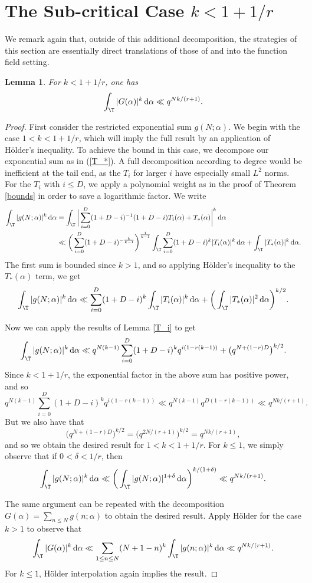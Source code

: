 \documentclass[reqno,11pt]{amsart}
\newtheorem{lemma}[theorem]{Lemma}
\theoremstyle{definition}
\theoremstyle{remark}
\numberwithin{equation}{section}
\renewcommand{\d}{\,{\rm d}} %
\newcommand{\<}{\begin{equation}}
\renewcommand{\>}{\end{equation}}
\begin{document}
\section{The Sub-critical Case $k<1+1/r$}

 We remark again that, outside of this additional decomposition, the strategies of this section are essentially direct translations of those of \cite{balog-ruzsa:2001} and \cite{keil:2013} into the function field setting.
\begin{lemma}\label{sub-upper}
    For $k < 1+1/r$, one has
    \[\int_\T |G(\alpha)|^k \d\alpha \ll q^{Nk/(r+1)}.\]
\end{lemma}
\begin{proof}
    First consider the restricted exponential sum $g(N;\alpha)$. We begin with the case $1 < k < 1+1/r$, which will imply the full result by an application of H\"older's inequality. To achieve the bound in this case, we decompose our exponential sum as in (\ref{T_*}). A full decomposition according to degree would be inefficient at the tail end, as the $T_i$ for larger $i$ have especially small $L^2$ norms. For the $T_i$ with $i\leq D$, we apply a polynomial weight as in the proof of Theorem \ref{bounds} in order to save a logarithmic factor. We write
    \begin{align*}
        \int_\T |g(N;\alpha)|^k \d\alpha &= \int_\T \bigg|\sum_{i=0}^{D} (1+D-i)^{-1}(1+D-i)T_i(\alpha)+ T_*(\alpha)\bigg|^k \d\alpha \\
        &\ll \bigg(\sum_{i=0}^D (1+D-i)^{-\frac{k}{k-1}}\bigg)^{\frac{1}{k-1}}\int_\T\sum_{i=0}^{D} (1+D-i)^k|T_i(\alpha)|^k\d\alpha + \int_\T | T_*(\alpha)|^k \d\alpha.
    \end{align*}
    The first sum is bounded since $k>1$, and so applying H\"older's inequality to the $T_*(\alpha)$ term, we get
    \[\int_\T |g(N;\alpha)|^k \d\alpha \ll \sum_{i=0}^{D} (1+D-i)^k\int_\T|T_i(\alpha)|^k\d\alpha + \bigg(\int_\T | T_*(\alpha)|^2 \d\alpha\bigg)^{k/2}.\]
    
    Now we can apply the results of Lemma \ref{T_i} to get
    \[\int_\T |g(N;\alpha)|^k \d\alpha \ll q^{N(k-1)}\sum_{i=0}^{D} (1+D-i)^kq^{i(1-r(k-1))} + \big(q^{N+(1-r)D}\big)^{k/2}.\]
    Since $k<1+1/r$, the exponential factor in the above sum has positive power, and so
    \[q^{N(k-1)}\sum_{i=0}^{D} (1+D-i)^k q^{i(1-r(k-1))} \ll q^{N(k-1)}q^{D(1-r(k-1))} \ll q^{Nk/(r+1)}.\]
    But we also have that
    \[\big(q^{N+(1-r)D}\big)^{k/2} = \big(q^{2N/(r+1)}\big)^{k/2} = q^{Nk/(r+1)},\]
    and so we obtain the desired result for $1<k<1+1/r$. For $k\leq 1$, we simply observe that if $0<\delta<1/r$, then
    \[\int_\T |g(N;\alpha)|^k \d\alpha \ll \bigg(\int_\T |g(N;\alpha)|^{1+\delta} \d\alpha\bigg)^{k/(1+\delta)} \ll q^{Nk/(r+1)}.\]

    The same argument can be repeated with the decomposition $G(\alpha) = \sum_{n \leq N} g(n;\alpha)$ to obtain the desired result. Apply H\"older for the case $k>1$ to observe that
    \[\int_\T |G(\alpha)|^k \d\alpha \ll \sum_{1\leq n \leq N} (N+1-n)^k\int_\T |g(n;\alpha)|^k \d\alpha \ll q^{Nk/(r+1)}.\]
    For $k\leq 1$, H\"older interpolation again implies the result.
\end{proof}
\end{document}
